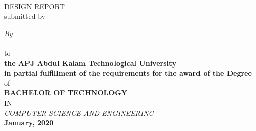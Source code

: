 \begin{titlepage}
\begin{center}
{\Large\sf \textbf{\textcolor[rgb]{0,0,0}{\projectName}}}\\[5ex]
\vspace{0.3 cm}
DESIGN REPORT\\
submitted by

{\small \textcolor[rgb]{0,0,0}{\emph{By}} \\[1ex]

{\sf \sf {\textcolor[rgb]{0,0,0}{
			\firstAuthor (\firstAuthorRegNo) \\ 
			\secondAuthor (\secondAuthorRegNo) \\
			\thirdAuthor (\thirdAuthorRegNo) \\
			\fourthAuthor (\fourthAuthorRegNo)}}} \\%
		  
\vspace{0.5 cm}
to
\\
\vspace{0.5 cm}
\textbf{the APJ Abdul Kalam Technological University \\
	in partial fulfillment of the requirements for the award of the Degree }\\
\vspace{0.8 cm}
of
\\
 

\textbf{BACHELOR OF TECHNOLOGY}}
\\
IN 
\\
\textit{COMPUTER SCIENCE AND ENGINEERING}
\\
    \textbf{ January, 2020}
\vspace{0.2 cm} \\[2ex]


\end{center}
\end{titlepage}
